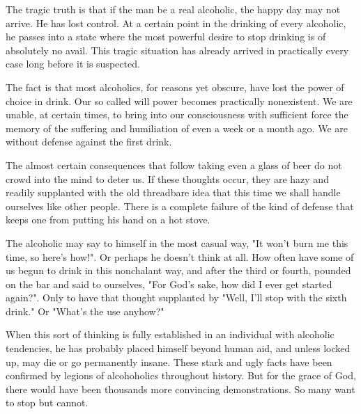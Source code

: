 \begin{biblechapter}
    The tragic truth is that if the man be a real alcoholic, 
    the happy day may not arrive. 
\verse He has lost control. 
\verse At a certain point in the drinking of every alcoholic, 
    he passes into a state where the most powerful desire to stop drinking 
    is of absolutely no avail. 
\verse This tragic situation has already arrived 
    in practically every case long before it is suspected.

\verse The fact is that most alcoholics, 
    for reasons yet obscure, 
    have lost the power of choice in drink. 
\verse Our so called will power becomes practically nonexistent. 
\verse We are unable, at certain times, 
    to bring into our consciousness with sufficient force 
    the memory of the suffering and humiliation 
    of even a week or a month ago. 
\verse We are without defense against the first drink.

\verse The almost certain consequences 
    that follow taking even a glass of beer 
    do not crowd into the mind to deter us. 
\verse If these thoughts occur, 
    they are hazy and readily supplanted with the old threadbare idea 
    that this time we shall handle ourselves like other people. 
\verse There is a complete failure of the kind of defense 
    that keeps one from putting his hand on a hot stove.

\verse The alcoholic may say to himself in the most casual way, 
    "It won't burn me this time, so here's how!". 
\verse Or perhaps he doesn't think at all. 
\verse How often have some of us begun to drink in this nonchalant way, 
    and after the third or fourth, 
    pounded on the bar and said to ourselves, 
    "For God's sake, how did I ever get started again?". 
\verse Only to have that thought supplanted by 
    "Well, I'll stop with the sixth drink." 
\verse Or "What's the use anyhow?"

\verse When this sort of thinking 
    is fully established in an individual with alcoholic tendencies, 
    he has probably placed himself beyond human aid, 
    and unless locked up, may die or go permanently insane. 
\verse These stark and ugly facts have been confirmed 
    by legions of alcohoholics throughout history. 
\verse But for the grace of God, 
    there would have been thousands more convincing demonstrations. 
\verse So many want to stop but cannot.
\end{biblechapter}


